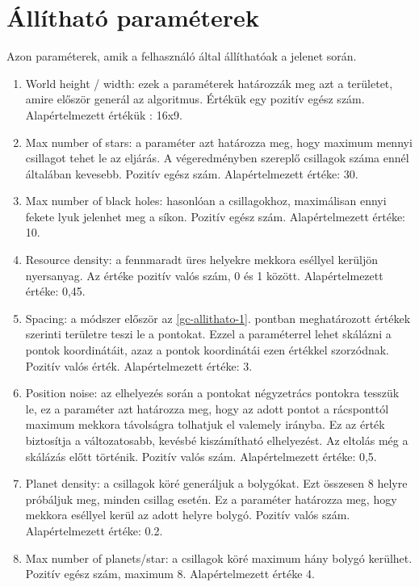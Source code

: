\section{Állítható paraméterek}
Azon paraméterek, amik a felhasználó által állíthatóak a jelenet során.
\begin{enumerate}
    \item \label{gc-allithato-1} World height / width: ezek a paraméterek határozzák meg azt a területet, amire először generál az algoritmus. Értékük egy pozitív egész szám. Alapértelmezett értékük : 16x9.
    \item Max number of stars: a paraméter azt határozza meg, hogy maximum mennyi csillagot tehet le az eljárás. A végeredményben szereplő csillagok száma ennél általában kevesebb. Pozitív egész szám. Alapértelmezett értéke: 30.
    \item Max number of black holes: hasonlóan a csillagokhoz, maximálisan ennyi fekete lyuk jelenhet meg a síkon. Pozitív egész szám. Alapértelmezett értéke: 10.
    \item Resource density: a fennmaradt üres helyekre mekkora eséllyel kerüljön nyersanyag. Az értéke pozitív valós szám, 0 és 1 között. Alapértelmezett értéke: 0,45.
    \item Spacing: a módszer először az \ref{gc-allithato-1}. pontban meghatározott értékek szerinti területre teszi le a pontokat. Ezzel a paraméterrel lehet skálázni a pontok koordinátáit, azaz a pontok koordinátái ezen értékkel szorzódnak. Pozitív valós érték. Alapértelmezett értéke: 3.
    \item Position noise: az elhelyezés során a pontokat négyzetrács pontokra tesszük le, ez a paraméter azt határozza meg, hogy az adott pontot a rácsponttól maximum mekkora távolságra tolhatjuk el valemely irányba. Ez az érték biztosítja a változatosabb, kevésbé kiszámítható elhelyezést. Az eltolás még a skálázás előtt történik. Pozitív valós szám. Alapértelmezett értéke: 0,5.
    \item Planet density: a csillagok köré generáljuk a bolygókat. Ezt összesen 8 helyre próbáljuk meg, minden csillag esetén. Ez a paraméter határozza meg, hogy mekkora eséllyel kerül az adott helyre bolygó. Pozitív valós szám. Alapértelmezett értéke: 0.2.
    \item Max number of planets/star: a csillagok köré maximum hány bolygó kerülhet. Pozitív egész szám, maximum 8. Alapértelmezett értéke 4. 
\end{enumerate}

